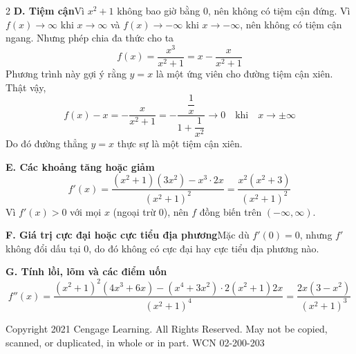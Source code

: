 \documentclass[10pt]{article}
\begin{document}
\begin{paracol}{2}
\vspace{5pt}
\noindent
\textbf{D. Tiệm cận}\quad Vì $x^2 + 1$ không bao giờ bằng 0, nên không có tiệm cận đứng. Vì $f(x) \to \infty$ khi $x \to \infty$ và $f(x) \to -\infty$ khi $x \to -\infty$, nên không có tiệm cận ngang. Nhưng phép chia đa thức cho ta
\begin{equation*}
f(x) = \frac{x^3}{x^2 + 1} = x - \frac{x}{x^2 + 1}
\end{equation*}
Phương trình này gợi ý rằng $y = x$ là một ứng viên cho đường tiệm cận xiên. Thật vậy,
\begin{equation*}
f(x) - x = -\frac{x}{x^2 + 1} = -\frac{\dfrac{1}{x}}{1 + \dfrac{1}{x^2}} \to 0 \quad \text{khi} \quad x \to \pm\infty
\end{equation*}
Do đó đường thẳng $y = x$ thực sự là một tiệm cận xiên.

\vspace{5pt}
\noindent
\textbf{E. Các khoảng tăng hoặc giảm}
\begin{equation*}
f'(x) = \frac{(x^2 + 1)(3x^2) - x^3 \cdot 2x}{(x^2 + 1)^2} = \frac{x^2(x^2 + 3)}{(x^2 + 1)^2}
\end{equation*}
Vì $f'(x) > 0$ với mọi $x$ (ngoại trừ 0), nên $f$ đồng biến trên $(-\infty, \infty)$.

\vspace{5pt}
\noindent
\textbf{F. Giá trị cực đại hoặc cực tiểu địa phương}\quad Mặc dù $f'(0) = 0$, nhưng $f'$ không đổi dấu tại 0, do đó không có cực đại hay cực tiểu địa phương nào.

\vspace{5pt}
\noindent
\textbf{G. Tính lồi, lõm và các điểm uốn}
\begin{equation*}
f''(x) = \frac{(x^2 + 1)^2(4x^3 + 6x) - (x^4 + 3x^2) \cdot 2(x^2 + 1)2x}{(x^2 + 1)^4} = \frac{2x(3 - x^2)}{(x^2 + 1)^3}
\end{equation*}

\end{paracol}

\vfill
\noindent
{\tiny\color{gray}Copyright 2021 Cengage Learning. All Rights Reserved. May not be copied, scanned, or duplicated, in whole or in part. WCN 02-200-203}
\end{document}
